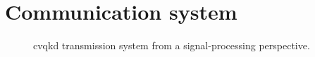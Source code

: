 \section{Communication system}

\begin{figure}[htb]
	\centering
	
	\caption{\Gls{cvqkd} transmission system from a signal-processing perspective.}
\end{figure}
